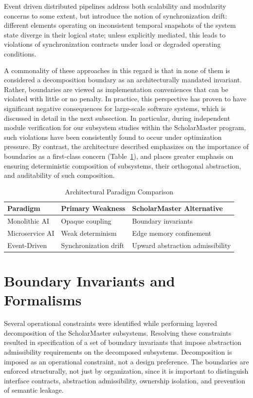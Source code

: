 \documentclass[conference]{IEEEtran}
\begin{document}
Event driven distributed pipelines \cite{b8} address both scalability and modularity concerns to some extent, but introduce the notion of synchronization drift: different elements operating on inconsistent temporal snapshots of the system state diverge in their logical state; unless explicitly mediated, this leads to violations of synchronization contracts under load or degraded operating conditions.

A commonality of these approaches in this regard is that in none of them is considered a decomposition boundary as an architecturally mandated invariant. Rather, boundaries are viewed as implementation conveniences that can be violated with little or no penalty. In practice, this perspective has proven to have significant negative consequences for large-scale software systems, which is discussed in detail in the next subsection. In particular, during independent module verification for our subsystem studies within the ScholarMaster program, such violations have been consistently found to occur under optimization pressure. By contrast, the architecture described emphasizes on the importance of boundaries as a first-class concern (Table~\ref{tab:related_work}), and places greater emphasis on ensuring deterministic composition of subsystems, their orthogonal abstraction, and auditability of such composition.

\begin{table}[htbp]
\caption{Architectural Paradigm Comparison}
\label{tab:related_work}
\centering
\begin{tabular}{@{}p{2.3cm} p{2.5cm} p{3.0cm}@{}}
\toprule
\textbf{Paradigm} & \textbf{Primary Weakness} & \textbf{ScholarMaster Alternative} \\
\midrule
Monolithic AI & Opaque coupling & Boundary invariants \\
\addlinespace
Microservice AI & Weak determinism & Edge memory confinement \\
\addlinespace
Event-Driven & Synchronization drift & Upward abstraction admissibility \\
\bottomrule
\end{tabular}
\end{table}

\section{Boundary Invariants and Formalisms}
Several operational constraints were identified while performing layered decomposition of the ScholarMaster subsystems. Resolving these constraints resulted in specification of a set of boundary invariants that impose abstraction admissibility requirements on the decomposed subsystems. Decomposition is imposed as an operational constraint, not a design preference. The boundaries are enforced structurally, not just by organization, since it is important to distinguish interface contracts, abstraction admissibility, ownership isolation, and prevention of semantic leakage.
\end{document}

